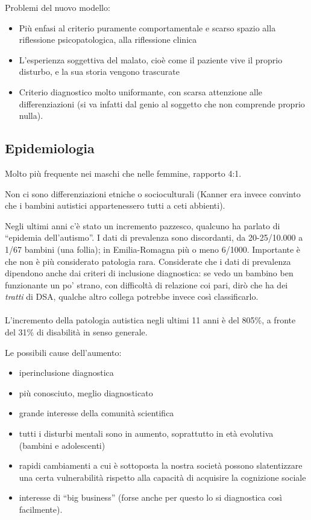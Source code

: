 Problemi del nuovo modello:

\begin{itemize}
\item
  Più enfasi al criterio puramente comportamentale e scarso spazio alla
  riflessione psicopatologica, alla riflessione clinica
\item
  L'esperienza soggettiva del malato, cioè come il paziente vive il
  proprio disturbo, e la sua storia vengono trascurate
\item
  Criterio diagnostico molto uniformante, con scarsa attenzione alle
  differenziazioni (si va infatti dal genio al soggetto che non
  comprende proprio nulla).
\end{itemize}

\subsection{Epidemiologia}

Molto più frequente nei maschi che nelle femmine, rapporto 4:1.

Non ci sono differenziazioni etniche o socioculturali (Kanner era invece
convinto che i bambini autistici appartenessero tutti a ceti abbienti).

Negli ultimi anni c'è stato un incremento pazzesco, qualcuno ha parlato
di ``epidemia dell'autismo''. I dati di prevalenza sono discordanti, da
20-25/10.000 a 1/67 bambini (una follia); in Emilia-Romagna più o meno
6/1000. Importante è che non è più considerato patologia rara.
Considerate che i dati di prevalenza dipendono anche dai criteri di
inclusione diagnostica: se vedo un bambino ben funzionante un po'
strano, con difficoltà di relazione coi pari, dirò che ha dei
\emph{tratti} di DSA, qualche altro collega potrebbe invece così
classificarlo.
\\\\
L'incremento della patologia autistica negli ultimi 11 anni è del 805\%,
a fronte del 31\% di disabilità in senso generale.

Le possibili cause dell'aumento:

\begin{itemize}
\item
  iperinclusione diagnostica
\item
  più conosciuto, meglio diagnosticato
\item
  grande interesse della comunità scientifica
\item
  tutti i disturbi mentali sono in aumento, soprattutto in età evolutiva
  (bambini e adolescenti)
\item
  rapidi cambiamenti a cui è sottoposta la nostra società possono
  slatentizzare una certa vulnerabilità rispetto alla capacità di
  acquisire la cognizione sociale
\item
  interesse di ``big business'' (forse anche per questo lo si
  diagnostica così facilmente).
\end{itemize}

